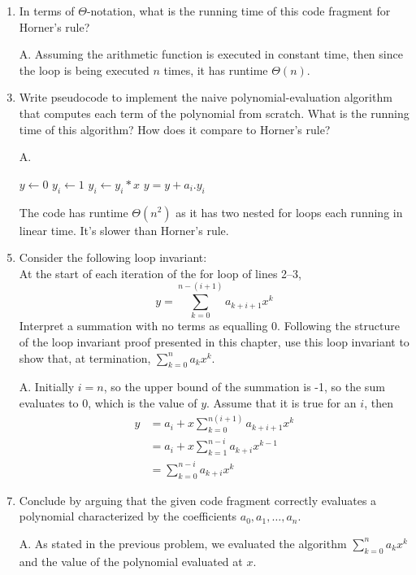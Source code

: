 \documentclass[fontsize=12pt,paper=a4]{book}
\begin{document}
\begin{enumerate}
	\begin{enumerate}
		\item In terms of $\Theta$-notation, what is the running time of this code fragment for Horner’s rule?
		\item[A.]
		Assuming the arithmetic function is executed in constant time, then since the loop is being executed $n$ times, it has runtime $\Theta(n)$.
		
		\item Write pseudocode to implement the naive polynomial-evaluation algorithm that computes each term of the polynomial from scratch. What is the running time of this algorithm? How does it compare to Horner’s rule?
		\item[A.]
		\begin{algorithmic}
			\State $y \gets 0$
				\State $y_i \gets 1$
					\State $y_i \gets y_i * x$
				\EndFor 
				\State $y = y + a_i . y_i$
			\EndFor			
		\end{algorithmic}		
		The code has runtime $\Theta(n^2)$ as it has two nested for loops each running in linear time. It’s slower than Horner’s rule.
		
		\item Consider the following loop invariant:\\
		At the start of each iteration of the for loop of lines 2–3,
		\begin{equation*}
		y = \sum_{k=0}^{n-(i+1)} a_{k+i+1} x^k
		\end{equation*}
		Interpret a summation with no terms as equalling 0. Following the structure of the loop invariant proof presented in this chapter, use this loop invariant to show that, at termination, $\sum_{k=0}^{n} a_k x^k$.
		\item[A.]
		Initially $i=n$, so the upper bound of the summation is -1, so the sum evaluates to 0, which is the value of $y$. Assume that it is true for an $i$, then 
		\begin{equation*}
			\begin{split}
				y & = a_i + x \sum_{k=0}^{n (i+1)} a_{k+i+1} x^k \\
				& = a_i + x \sum_{k=1}^{n-i} a_{k+i} x^{k-1} \\
				& = \sum_{k=0}^{n-i} a_{k+i} x^{k}
			\end{split}
		\end{equation*}
		
		\item Conclude by arguing that the given code fragment correctly evaluates a polynomial characterized by the coefficients $a_0, a_1, \dots , a_n$.
		\item[A.]
		As stated in the previous problem, we evaluated the algorithm $\sum_{k=0}^{n} a_k x^k$ and the value of the polynomial evaluated at $x$.		
	\end{enumerate}
	

\end{enumerate}
\end{document}
